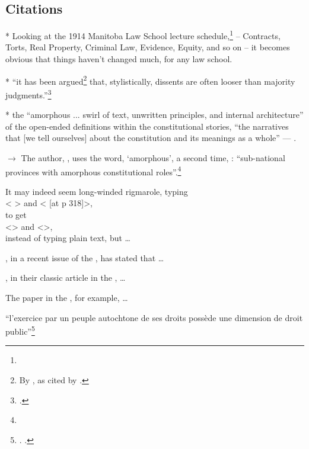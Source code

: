 \subsection{Citations}


* Looking at the 1914 Manitoba Law School lecture schedule,\footnote{} -- Contracts, Torts, Real Property, Criminal Law, Evidence, Equity, and so on -- it becomes obvious that things haven't changed much, for any law school.

* ``it has been argued\footnote{By , as cited by .} that, stylistically,
dissents are often looser than majority judgments.''\footnote{.}\bigskip 


* the ``amorphous ... swirl of text,
unwritten principles, and internal architecture'' of the open-ended definitions within the constitutional stories, ``the narratives that [we tell ourselves] about the
constitution and its meanings as a whole''
 --- .\bigskip


$\rightarrow$ The author, , uses the word, `amorphous', a second time, : ``sub-national provinces with
amorphous constitutional roles''.\footnote{}

It may indeed seem long-winded rigmarole, typing\\
<  > and < [at p 318]>,\\ to get\\ <> and <>,\\ instead of typing plain text, but \ldots

, in a recent issue of the , has stated that \ldots

, in their classic article in the , \ldots

The  paper in the , for example, \ldots
\bigskip

``l’exercice par un peuple autochtone de
ses droits possède une dimension de droit public''\footnote{. .}


